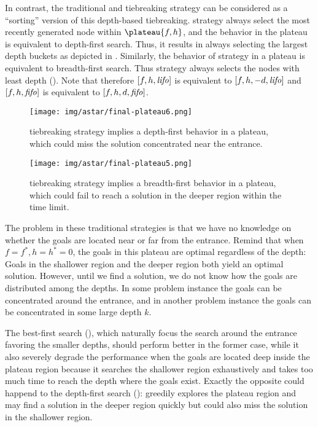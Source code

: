 In contrast, the traditional \lifo and \fifo tiebreaking strategy can be
considered as a ``sorting'' version of this depth-based tiebreaking.
\lifo strategy always select the most recently generated node
within $\plateau{f,h}$, and the behavior in the plateau is equivalent to depth-first search.
Thus, it results in always selecting the largest depth
buckets as depicted in .
Similarly, the behavior of \fifo strategy 
in a plateau is equivalent to breadth-first search. Thus \fifo strategy
always selects the nodes with least depth ().
Note that therefore $[f,h,{\mbox{\textit{lifo}}}]$ is equivalent to $[f,h,-d,{\mbox{\textit{lifo}}}]$ and
$[f,h,{\mbox{\textit{fifo}}}]$ is equivalent to $[f,h,d,{\mbox{\textit{fifo}}}]$.

\begin{figure}[htbp]
 \texttt{[image: img/astar/final-plateau6.png]}
 \caption{\lifo tiebreaking strategy implies a depth-first behavior in a
 plateau, which could miss the solution concentrated near the entrance.}
 \label{fig:plateau-depiction-lifo}
\end{figure}

\begin{figure}[htbp]
 \texttt{[image: img/astar/final-plateau5.png]}
 \caption{\fifo tiebreaking strategy implies a breadth-first behavior in a
 plateau, which could fail to reach a solution in the deeper region
 within the time limit.}
 \label{fig:plateau-depiction-fifo}
\end{figure}

The problem in these traditional strategies is that we have no knowledge
on whether the goals are located near or far from the entrance. Remind
that when $f=f^*, h=h^*=0$, the goals in this plateau are optimal
regardless of the depth: Goals in the shallower region and the deeper
region both yield an optimal solution. However, until we find a
solution, we do not know how the goals are distributed among the
depths. In some problem instance the goals can be concentrated around
the entrance, and in another problem instance the goals can be
concentrated in some large depth $k$.


The best-first search (\fifo), which naturally focus the search around
the entrance favoring the smaller depths, should perform better in the
former case, while it also severely degrade the performance when the
goals are located deep inside the plateau region because it searches the
shallower region exhaustively and takes too much time to reach the depth
where the goals exist.
Exactly the opposite could happend to the depth-first search (\lifo):
\lifo greedily explores the
plateau region and may find a solution in the deeper region quickly but
could also miss the solution in the shallower region.

